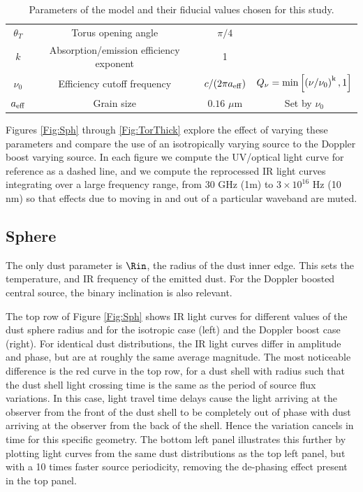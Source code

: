 \begin{table}
\begin{center}
\begin{tabular}{ c | c | c | c}
{$\theta_T$}     &  Torus opening angle   								  & $\pi/4$						&	\\
$k$		        &  Absorption/emission efficiency exponent       				& 1 							&	\\
$\nu_0$		& Efficiency cutoff frequency							&    $c/(2 \pi a_{\rm{eff}})$			& $Q_{\nu} = \rm{min}\left[ \left( \nu/ \nu_0 \right)^{k}, 1\right]$	\\
$a_{\rm{eff}}$	&  Grain size         	       								&  $0.16$ $\mu$m		       		&  Set by $\nu_0$		
 \end{tabular}
\caption{Parameters of the model and their fiducial values chosen for this study.}
\label{Table:params}
\end{center}
\end{table}
%
Figures \ref{Fig:Sph} through \ref{Fig:TorThick} explore the effect of varying these parameters and compare the use of an isotropically varying source to the Doppler boost varying source. In each figure we compute the UV/optical light curve for reference as a dashed line, and we compute the reprocessed IR light curves integrating over a large frequency range, from 30 GHz  (1m) to $3\times10^{16}$ Hz (10 nm) so that effects due to moving in and out of a particular waveband are muted. 



\subsection{Sphere}

The only dust parameter is $\Rin$, the radius of the dust inner edge. This
sets the temperature, and IR frequency of the emitted dust. For the Doppler
boosted central source, the binary inclination is also relevant. 

The top row of Figure \ref{Fig:Sph} shows IR light curves for different values
of the dust sphere radius and for the isotropic case (left) and the Doppler
boost case (right). For identical dust distributions, the IR light curves
differ in amplitude and phase, but are at roughly the same average magnitude.
The most noticeable difference is the red curve in the top row, for a dust
shell with radius such that the dust shell light crossing time is the same as
the period of source flux variations. In this case, light travel time delays
cause the light arriving at the observer from the front of the dust shell to
be completely out of phase with dust arriving at the observer from the back of
the shell. Hence the variation cancels in time for this specific geometry. The bottom left panel illustrates this further by plotting light curves from the same dust distributions as the top left panel, but with a 10 times faster source periodicity, removing the de-phasing effect present in the top panel.



